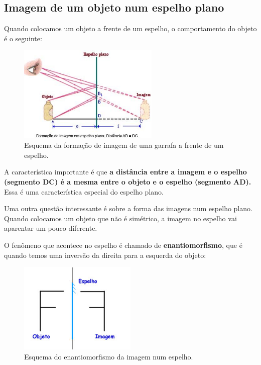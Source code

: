 \documentclass[12pt]{extarticle}
\newcommand{\<}{\langle}
\renewcommand{\>}{\rangle}
\theoremstyle{definition}
\begin{document}
\subsection{Imagem de um objeto num espelho plano}

Quando colocamos um objeto a frente de um espelho, o comportamento do objeto é o seguinte:
\begin{figure}[H]
    \centering
    \includegraphics[width=0.6\textwidth]{plano_1.jpg}
    \caption{Esquema da formação de imagem de uma garrafa a frente de um espelho.}
    \label{fig:plano_1}
\end{figure}

A característica importante é que \textbf{a distância entre a imagem e o espelho (segmento DC) é a mesma entre o objeto e o espelho (segmento AD).} Essa é uma característica especial do espelho plano.

Uma outra questão interessante é sobre a forma das imagens num espelho plano. Quando colocamos um objeto que não é simétrico, a imagem no espelho vai aparentar um pouco diferente.

O fenômeno que acontece no espelho é chamado de \textbf{enantiomorfismo}, que é quando temos uma inversão da direita para a esquerda do objeto:

\begin{figure}[H]
    \centering
    \includegraphics[width=0.5\textwidth]{enantiomorfismo.jpg}
    \caption{Esquema do enantiomorfismo da imagem num espelho.}
    \label{fig:enantiomorfismo}
\end{figure}
\end{document}
